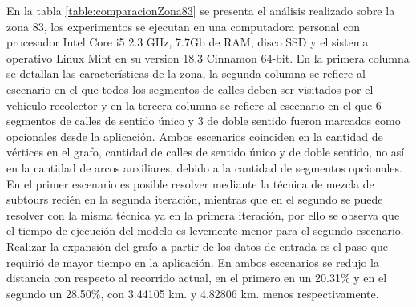 \documentclass[conference]{IEEEtran}
\begin{document}
En la tabla \ref{table:comparacionZona83} se presenta el análisis realizado sobre la zona 83, los experimentos se ejecutan en una computadora personal con procesador Intel\textcopyright{}  Core\texttrademark{} i5 2.3 GHz, 7.7Gb de RAM, disco SSD y el sistema operativo Linux Mint en su version 18.3 Cinnamon 64-bit. En la primera columna se detallan las características de la zona, la segunda columna se refiere al escenario en el que todos los segmentos de calles deben ser visitados por el vehículo recolector y en la tercera columna se refiere al escenario en el que 6 segmentos de calles de sentido único y 3 de doble sentido fueron marcados como opcionales desde la aplicación. Ambos escenarios coinciden en la cantidad de vértices en el grafo, cantidad de calles de sentido único y de doble sentido, no así en la cantidad de arcos auxiliares, debido a la cantidad de segmentos opcionales. En el primer escenario es posible resolver mediante la técnica de mezcla de subtours recién en la segunda iteración, mientras que en el segundo se puede resolver con la misma técnica ya en la primera iteración, por ello se observa que el tiempo de ejecución del modelo es levemente menor para el segundo escenario. Realizar la expansión del grafo a partir de los datos de entrada es el paso que requirió de mayor tiempo en la aplicación. En ambos escenarios se redujo la distancia con respecto al recorrido actual, en el primero en un 20.31\% y en el segundo un 28.50\%, con 3.44105 km. y 4.82806 km. menos respectivamente.
\end{document}
